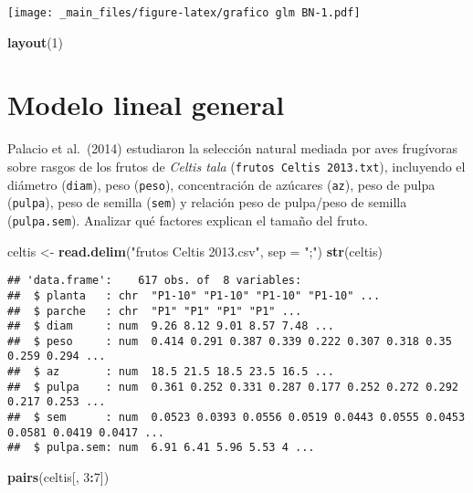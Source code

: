 \documentclass[
]{book}
\newenvironment{Shaded}{\begin{snugshade}}{\end{snugshade}}
\newcommand{\DataTypeTok}[1]{\textcolor[rgb]{0.13,0.29,0.53}{#1}}
\newcommand{\DecValTok}[1]{\textcolor[rgb]{0.00,0.00,0.81}{#1}}
\newcommand{\KeywordTok}[1]{\textcolor[rgb]{0.13,0.29,0.53}{\textbf{#1}}}
\newcommand{\NormalTok}[1]{#1}
\newcommand{\OperatorTok}[1]{\textcolor[rgb]{0.81,0.36,0.00}{\textbf{#1}}}
\newcommand{\StringTok}[1]{\textcolor[rgb]{0.31,0.60,0.02}{#1}}
\begin{document}
\texttt{[image: \_main\_files/figure-latex/grafico glm BN-1.pdf]}

\begin{Shaded}
\begin{Highlighting}[]
\KeywordTok{layout}\NormalTok{(}\DecValTok{1}\NormalTok{)}
\end{Highlighting}
\end{Shaded}

\hypertarget{modelo-lineal-general}{%
\section{Modelo lineal general}\label{modelo-lineal-general}}

Palacio et al.~(2014) estudiaron la selección natural mediada por aves frugívoras sobre rasgos de los frutos de \emph{Celtis tala} (\texttt{frutos\ Celtis\ 2013.txt}), incluyendo el diámetro (\texttt{diam}), peso (\texttt{peso}), concentración de azúcares (\texttt{az}), peso de pulpa (\texttt{pulpa}), peso de semilla (\texttt{sem}) y relación peso de pulpa/peso de semilla (\texttt{pulpa.sem}). Analizar qué factores explican el tamaño del fruto.

\begin{Shaded}
\begin{Highlighting}[]
\NormalTok{celtis <-}\StringTok{ }\KeywordTok{read.delim}\NormalTok{(}\StringTok{"frutos Celtis 2013.csv"}\NormalTok{, }\DataTypeTok{sep =} \StringTok{";"}\NormalTok{)}
\KeywordTok{str}\NormalTok{(celtis)}
\end{Highlighting}
\end{Shaded}

\begin{verbatim}
## 'data.frame':    617 obs. of  8 variables:
##  $ planta   : chr  "P1-10" "P1-10" "P1-10" "P1-10" ...
##  $ parche   : chr  "P1" "P1" "P1" "P1" ...
##  $ diam     : num  9.26 8.12 9.01 8.57 7.48 ...
##  $ peso     : num  0.414 0.291 0.387 0.339 0.222 0.307 0.318 0.35 0.259 0.294 ...
##  $ az       : num  18.5 21.5 18.5 23.5 16.5 ...
##  $ pulpa    : num  0.361 0.252 0.331 0.287 0.177 0.252 0.272 0.292 0.217 0.253 ...
##  $ sem      : num  0.0523 0.0393 0.0556 0.0519 0.0443 0.0555 0.0453 0.0581 0.0419 0.0417 ...
##  $ pulpa.sem: num  6.91 6.41 5.96 5.53 4 ...
\end{verbatim}

\begin{Shaded}
\begin{Highlighting}[]
\KeywordTok{pairs}\NormalTok{(celtis[, }\DecValTok{3}\OperatorTok{:}\DecValTok{7}\NormalTok{])}
\end{Highlighting}
\end{Shaded}
\end{document}
